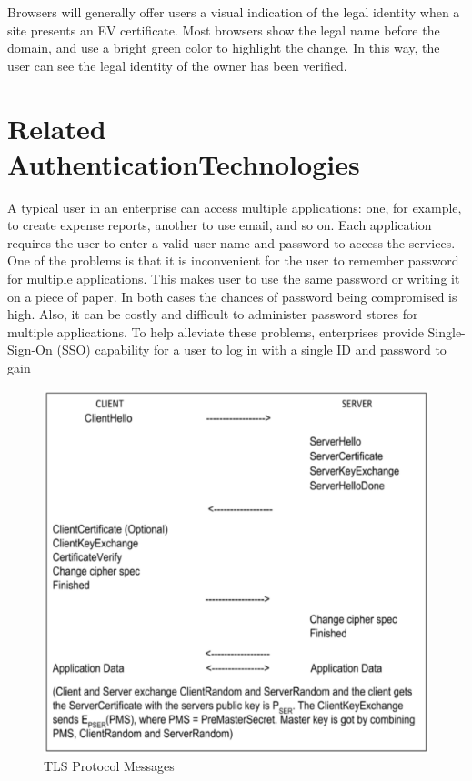 \begin{multicols}{2}
Browsers will generally offer users a visual indication of the legal identity when a site presents an EV certificate. Most browsers show the legal name before the domain, and use a bright green color to highlight the change. In this way, the user can see the legal identity of the owner has been verified.\\[-22pt]

\section{Related Authentication\hfill\break Technologies}

\vskip -3pt

{\parfillskip=0pt
A typical user in an enterprise can access multiple applications: one, for example, to create expense reports, another to use email, and so on. Each application requires the user to enter a valid user name and password to access the services. One of the problems is that it is inconvenient for the user to remember password for multiple applications. This makes user to use the same password or writing it on a piece of paper. In both cases the chances of password being compromised is high. Also, it can be costly and difficult to administer password stores for multiple applications. To help alleviate these problems, enterprises provide Single-Sign-On (SSO) capability for a user to log in with a single ID and password to gain\par}
\end{multicols}

\newpage

\begin{figure}[!ht]
\centering
\includegraphics[scale=.85]{src/Figures/chap2/5.eps}
\caption{TLS Protocol Messages}\label{chap2-fig5}
\end{figure}

